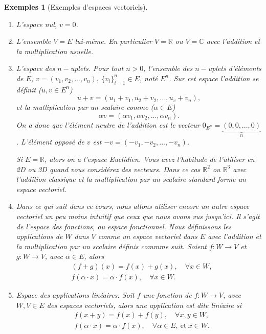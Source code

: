 \documentclass[a4paper,12pt]{book}
\newcommand{\real}{\mathbb{R}}
\newcommand{\complex}{\mathbb{C}}
\newtheorem*{exemples}{Exemples}
\begin{document}
\begin{exemples}[Exemples d'espaces vectoriels]\hfill\break

 \begin{enumerate}
  \item L'espace nul, $v=0$.
  \item L'ensemble $V=E$ lui-même. En particulier $V=\real$ ou $V=\complex$ avec l'addition et la multiplication usuelle.
  \item L'espace des $n-$uplets. Pour tout $n>0$, l'ensemble des $n-$uplets d'éléments de $E$, $v=(v_1,v_2,...,v_n),\ \{v_i\}_{i=1}^n\in E$,
  noté $E^n$. Sur cet espace l'addition se définit ($u,v\in E^n$)
  \begin{equation}
   u+v=(u_1+v_1,u_2+v_2,...,u_v+v_n),
  \end{equation}
  et la mutliplication par un scalaire comme ($\alpha\in E$)
  \begin{equation}
   \alpha v=(\alpha v_1,\alpha v_2,...,\alpha v_n).
  \end{equation}
  On a donc que l'élément neutre de l'addition est le vecteur $0_{E^n}=\underbrace{(0,0,...,0)}_{n}$. L'élément opposé de 
  $v$ est $-v=(-v_1,-v_2,...,-v_n)$. 
  
  Si $E=\real$, alors on a l'espace Euclidien. Vous avez l'habitude de l'utiliser en 2D ou 3D 
  quand vous considérez des vecteurs. Dans ce cas $\real^2$ ou $\real^3$ avec l'addition classique
  et la multiplication par un scalaire standard forme un espace vectoriel.
  \item Dans ce qui suit dans ce cours, nous allons utiliser encore un autre espace vectoriel
  un peu moins intuitif que ceux que nous avons vus jusqu'ici. Il s'agit de l'espace des fonctions, ou espace fonctionnel.
  Nous définissons les applications de $W$ dans $V$ comme un espace vectoriel dans $E$ avec l'addition et la
  multiplication par un scalaire définis commme suit. Soient $f:W\rightarrow V$ et $g:W\rightarrow V$, avec
  $\alpha\in E$, alors
  \begin{align}
   &(f+g)(x)=f(x)+g(x), \quad \forall x\in W,\\
   &f(\alpha\cdot x)=\alpha\cdot f(x), \quad \forall x\in W.
  \end{align}
  \item Espace des applications linéaires. Soit $f$ une fonction de $f:W\rightarrow V$, avec $W,V\in E$ des espaces vectoriels,
  alors une application est dite linéaire si 
  \begin{align}
   &f(x+y)=f(x)+f(y),\quad \forall x,y\in W,\\
   &f(\alpha \cdot x)=\alpha \cdot f(x),\quad \forall \alpha\in E,\ \mbox{et}\ x\in W.
  \end{align}

 \end{enumerate}
\end{exemples}
\end{document}
